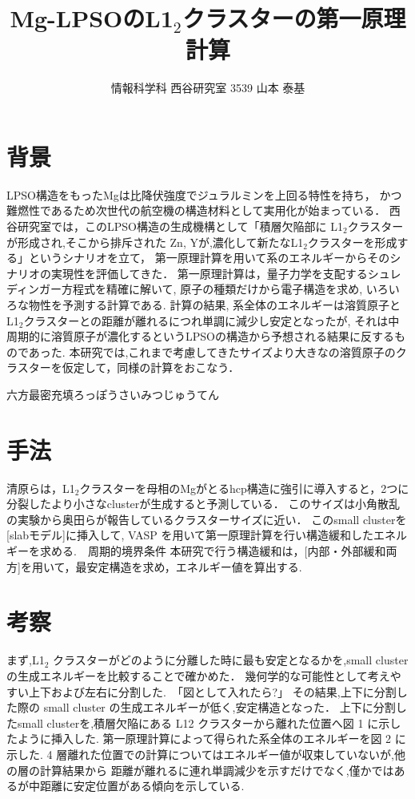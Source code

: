 \documentclass[a4j,twocolumn]{jsarticle}
\begin{document}
\title{Mg-LPSOのL1$_2$クラスターの第一原理計算}
\author{情報科学科 西谷研究室 3539 山本 泰基}
\date{}
\maketitle
\section{背景}
LPSO構造をもったMgは比降伏強度でジュラルミンを上回る特性を持ち，
かつ難燃性であるため次世代の航空機の構造材料として実用化が始まっている．
西谷研究室では，このLPSO構造の生成機構として「積層欠陥部に L1$_2$クラスターが形成され,そこから排斥された Zn, Yが,濃化して新たなL1$_2$クラスターを形成する」というシナリオを立て\cite{sakamoto}，
第一原理計算を用いて系のエネルギーからそのシナリオの実現性を評価してきた． 
第一原理計算は，量子力学を支配するシュレディンガー方程式を精確に解いて, 原子の種類だけから電子構造を求め, いろいろな物性を予測する計算である. 
計算の結果, 系全体のエネルギーは溶質原子とL1$_2$クラスターとの距離が離れるにつれ単調に減少し安定となったが, それは中周期的に溶質原子が濃化するというLPSOの構造から予想される結果に反するものであった. 
本研究では,これまで考慮してきたサイズより大きなの溶質原子のクラスターを仮定して，同様の計算をおこなう．

六方最密充填ろっぽうさいみつじゅうてん

\section{手法}
清原らは，L1$_2$クラスターを母相のMgがとるhcp構造に強引に導入すると，2つに分裂したより小さなclusterが生成すると予測している\cite{kiyohara}．
このサイズは小角散乱の実験から奥田らが報告しているクラスターサイズに近い\cite{okuda}．
このsmall clusterを[slabモデル]に挿入して, VASP を用いて第一原理計算を行い構造緩和したエネルギーを求める.　周期的境界条件
本研究で行う構造緩和は，[内部・外部緩和両方]を用いて，最安定構造を求め，エネルギー値を算出する.

\section{考察}
まず,L1$_2$ クラスターがどのように分離した時に最も安定となるかを,small cluster の生成エネルギーを比較することで確かめた．
幾何学的な可能性として考えやすい上下および左右に分割した.　「図として入れたら?」
その結果,上下に分割した際の small cluster の生成エネルギーが低く,安定構造となった．
上下に分割したsmall clusterを,積層欠陥にある L12 クラスターから離れた位置へ図 1 に示したように挿入した. 
第一原理計算によって得られた系全体のエネルギーを図 2 に示した. 4 層離れた位置での計算についてはエネルギー値が収束していないが,他の層の計算結果から 距離が離れるに連れ単調減少を示すだけでなく,僅かではあるが中距離に安定位置がある傾向を示している. 
\end{document}

